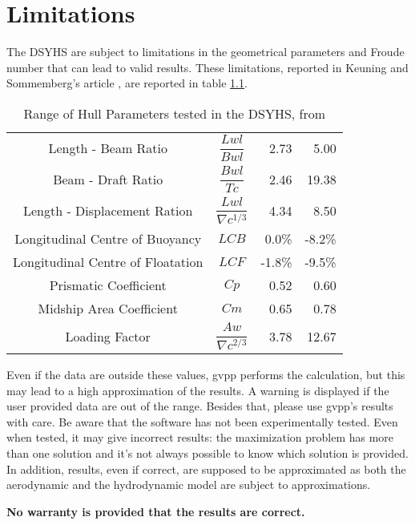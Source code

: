 \documentclass[a4paper,openany]{memoir}
\begin{document}
\chapter{Limitations}
\label{chapter_Limitations}

The DSYHS are subject to limitations in the geometrical parameters and Froude number that can lead to valid results. These limitations, reported in Keuning and Sommemberg's article \cite{DSYHS}, are reported in table \ref{tab:DSYHS_parameters_range}.

\begin{table}[h]
  \centering
  \begin{tabular}{c c r r}
    Length - Beam Ratio  & $\dfrac{Lwl}{Bwl}$ & 2.73 & 5.00  \\[1.2em]
    Beam - Draft Ratio   & $\dfrac{Bwl}{Tc }$ & 2.46 & 19.38 \\[1.2em]
    Length - Displacement Ration & $\dfrac{Lwl}{\nabla c ^ {1/3}}$ & 4.34 & 8.50 \\[1.2em]
    Longitudinal Centre of Buoyancy & $LCB$ & 0.0\% & -8.2\% \\[1.2em]
    Longitudinal Centre of Floatation & $LCF$ & -1.8\% & -9.5\% \\[1.2em]
    Prismatic Coefficient & $Cp$ & 0.52 & 0.60 \\[1.2em]
    Midship Area Coefficient & $Cm$ & 0.65 & 0.78 \\[1.2em]
    Loading Factor & $\dfrac{Aw}{\nabla c ^ {2/3}} $ & 3.78 & 12.67 
  \end{tabular}
  \caption{Range of Hull Parameters tested in the DSYHS, from \cite{DSYHS}}
  \label{tab:DSYHS_parameters_range}
\end{table}

Even if the data are outside these values, gvpp performs the calculation, but this may lead to a high approximation of the results. A warning is displayed if the user provided data are out of the range.
Besides that, please use gvpp's results with care.
Be aware that the software has not been experimentally tested. Even when tested, it may give incorrect results: the maximization problem has more than one solution and it's not always possible to know which solution is provided. In addition, results, even if correct, are supposed to be approximated as both the aerodynamic and the hydrodynamic model are subject to approximations.

\begin{center} 
  \textbf{No warranty is provided that the results are correct.} 
\end{center}
\end{document}
